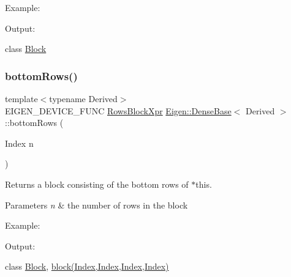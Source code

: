 Example\+: 
\begin{DoxyCodeInclude}{0}
\end{DoxyCodeInclude}
 Output\+: 
\begin{DoxyVerbInclude}
\end{DoxyVerbInclude}
 class \mbox{\hyperlink{class_eigen_1_1_block}{Block}} \mbox{\label{class_eigen_1_1_dense_base_acff625e5f44ffe92bf79d20223114c2d}} 
\subsubsection{\texorpdfstring{bottomRows()}{bottomRows()}\hspace{0.1cm}{\footnotesize\ttfamily [1/2]}}
{\footnotesize\ttfamily template$<$typename Derived$>$ \\
E\+I\+G\+E\+N\+\_\+\+D\+E\+V\+I\+C\+E\+\_\+\+F\+U\+NC \mbox{\hyperlink{class_eigen_1_1_block}{Rows\+Block\+Xpr}} \mbox{\hyperlink{class_eigen_1_1_dense_base}{Eigen\+::\+Dense\+Base}}$<$ Derived $>$\+::bottom\+Rows (\begin{DoxyParamCaption}\item[{Index}]{n }\end{DoxyParamCaption})\hspace{0.3cm}{\ttfamily [inline]}}

\begin{DoxyReturn}{Returns}
a block consisting of the bottom rows of $\ast$this.
\end{DoxyReturn}

\begin{DoxyParams}{Parameters}
{\em n} & the number of rows in the block\\
\hline
\end{DoxyParams}
Example\+: 
\begin{DoxyCodeInclude}{0}
\end{DoxyCodeInclude}
 Output\+: 
\begin{DoxyVerbInclude}
\end{DoxyVerbInclude}
 class \mbox{\hyperlink{class_eigen_1_1_block}{Block}}, \mbox{\hyperlink{class_eigen_1_1_dense_base_ab8e42e67c5cfd5fa13e684642f0f65bf}{block(\+Index,\+Index,\+Index,\+Index)}} \mbox{\label{class_eigen_1_1_dense_base_a7c9783f4e62212b5b6eb6569f282e95c}} 
